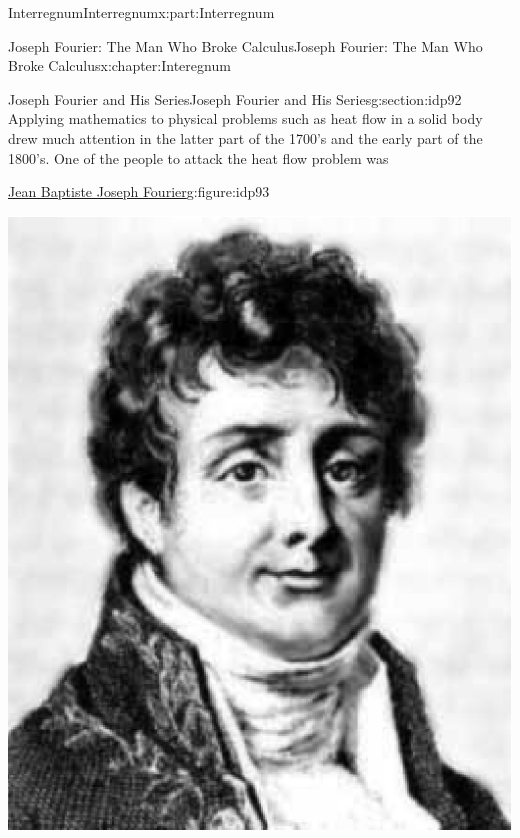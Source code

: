 \typeout{************************************************}
\typeout{************************************************}
%
\begin{partptx}{Interregnum}{}{Interregnum}{}{}{x:part:Interregnum}
	\typeout{************************************************}
	\typeout{************************************************}
	\begin{chapterptx}{Joseph Fourier: The Man Who Broke Calculus}{}{Joseph Fourier: The Man Who Broke Calculus}{}{}{x:chapter:Interegnum}
		\typeout{************************************************}
		\typeout{************************************************}
		\begin{sectionptx}{Joseph Fourier and His Series}{}{Joseph Fourier and His Series}{}{}{g:section:idp92}
			Applying mathematics to physical problems such as heat flow in a solid body drew much attention in the latter part of the 1700's and the early part of the 1800's. One of the people to attack the heat flow problem was%
			\begin{figureptx}{\href{https://mathshistory.st-andrews.ac.uk/Biographies/Fourier/}{Jean Baptiste Joseph Fourier}\protect\footnotemark{}}{g:figure:idp93}{}%
				\begin{image}{0.325}{0.35}{0.325}%
					\includegraphics[width=\linewidth]{external/images/Fourier.png}

\end{image}
\end{figureptx}
\end{sectionptx}
\end{chapterptx}
\end{partptx}
